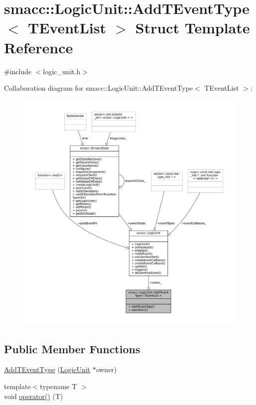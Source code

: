 \hypertarget{structsmacc_1_1LogicUnit_1_1AddTEventType}{}\section{smacc\+:\+:Logic\+Unit\+:\+:Add\+T\+Event\+Type$<$ T\+Event\+List $>$ Struct Template Reference}
\label{structsmacc_1_1LogicUnit_1_1AddTEventType}


{\ttfamily \#include $<$logic\+\_\+unit.\+h$>$}



Collaboration diagram for smacc\+:\+:Logic\+Unit\+:\+:Add\+T\+Event\+Type$<$ T\+Event\+List $>$\+:
\nopagebreak
\begin{figure}[H]
\begin{center}
\leavevmode
\includegraphics[width=350pt]{structsmacc_1_1LogicUnit_1_1AddTEventType__coll__graph}
\end{center}
\end{figure}
\subsection*{Public Member Functions}
\begin{DoxyCompactItemize}
\item 
\hyperlink{structsmacc_1_1LogicUnit_1_1AddTEventType_a9eaeba0a2daf1ef60b96cee216f9383d}{Add\+T\+Event\+Type} (\hyperlink{classsmacc_1_1LogicUnit}{Logic\+Unit} $\ast$owner)
\item 
{\footnotesize template$<$typename T $>$ }\\void \hyperlink{structsmacc_1_1LogicUnit_1_1AddTEventType_a597bfed7ec443692a312a5dec3848a09}{operator()} (T)
\end{DoxyCompactItemize}
